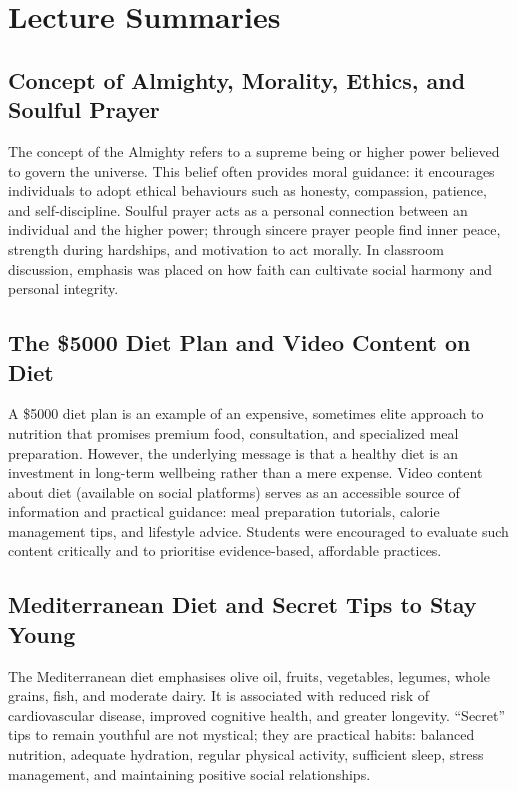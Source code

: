 \documentclass[a4paper,12pt]{article}
\begin{document}
\section*{Lecture Summaries}
\subsection*{Concept of Almighty, Morality, Ethics, and Soulful Prayer}
The concept of the Almighty refers to a supreme being or higher power believed to govern the universe. This belief often provides moral guidance: it encourages individuals to adopt ethical behaviours such as honesty, compassion, patience, and self-discipline. Soulful prayer acts as a personal connection between an individual and the higher power; through sincere prayer people find inner peace, strength during hardships, and motivation to act morally. In classroom discussion, emphasis was placed on how faith can cultivate social harmony and personal integrity.

\subsection*{The \$5000 Diet Plan and Video Content on Diet}
A \$5000 diet plan is an example of an expensive, sometimes elite approach to nutrition that promises premium food, consultation, and specialized meal preparation. However, the underlying message is that a healthy diet is an investment in long-term wellbeing rather than a mere expense. Video content about diet (available on social platforms) serves as an accessible source of information and practical guidance: meal preparation tutorials, calorie management tips, and lifestyle advice. Students were encouraged to evaluate such content critically and to prioritise evidence-based, affordable practices.

\subsection*{Mediterranean Diet and Secret Tips to Stay Young}
The Mediterranean diet emphasises olive oil, fruits, vegetables, legumes, whole grains, fish, and moderate dairy. It is associated with reduced risk of cardiovascular disease, improved cognitive health, and greater longevity. ``Secret'' tips to remain youthful are not mystical; they are practical habits: balanced nutrition, adequate hydration, regular physical activity, sufficient sleep, stress management, and maintaining positive social relationships.
\end{document}
